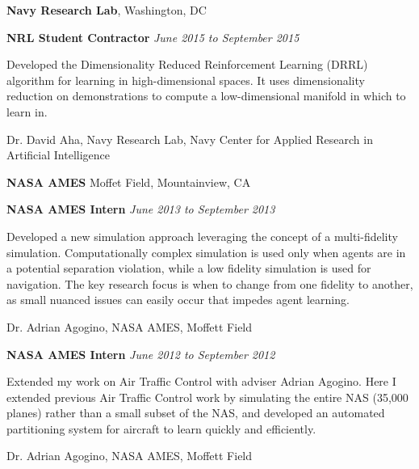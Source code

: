 \documentclass[10pt]{article}
\newcommand{\halfblankline}{\quad\vspace{-0.5\baselineskip}\pagebreak[3]}
\begin{document}
\textbf{Navy Research Lab},
Washington, DC
\begin{outerlist}

\item[] \textbf{NRL Student Contractor}%
        \hfill \textit{June 2015 to September 2015}
	\begin{innerlist}
		\item Developed the Dimensionality Reduced Reinforcement Learning (DRRL) algorithm for learning in high-dimensional spaces. It uses dimensionality reduction on demonstrations to compute a low-dimensional manifold in which to learn in.
		\begin{innerlist}
			\item Dr. David Aha, Navy Research Lab, Navy Center for Applied Research in Artificial Intelligence
		\end{innerlist}
	\end{innerlist}
\end{outerlist}


\textbf{NASA AMES}
Moffet Field, Mountainview, CA
\begin{outerlist}

\item[] \textbf{NASA AMES Intern}%
        \hfill \textit{June 2013 to September 2013}
	\begin{innerlist}
		\item Developed a new simulation approach leveraging the concept of a multi-fidelity simulation. Computationally complex simulation is used only when agents are in a potential separation violation, while a low fidelity simulation is used for navigation. The key research focus is when to change from one fidelity to another, as small nuanced issues can easily occur that impedes agent learning.
		\begin{innerlist}
			\item Dr. Adrian Agogino, NASA AMES, Moffett Field
		\end{innerlist}
	\end{innerlist}


\item[] \textbf{NASA AMES Intern}%
        \hfill \textit{June 2012 to September 2012}
	\begin{innerlist}
		\item Extended my work on Air Traffic Control with adviser Adrian Agogino. Here I extended previous Air Traffic Control work by simulating the entire NAS (35,000 planes) rather than a small subset of the NAS, and developed an automated partitioning system for aircraft to learn quickly and efficiently.
		\begin{innerlist}
			\item Dr. Adrian Agogino, NASA AMES, Moffett Field
		\end{innerlist}
	\end{innerlist}
		
\halfblankline
\end{outerlist}
\end{document}
